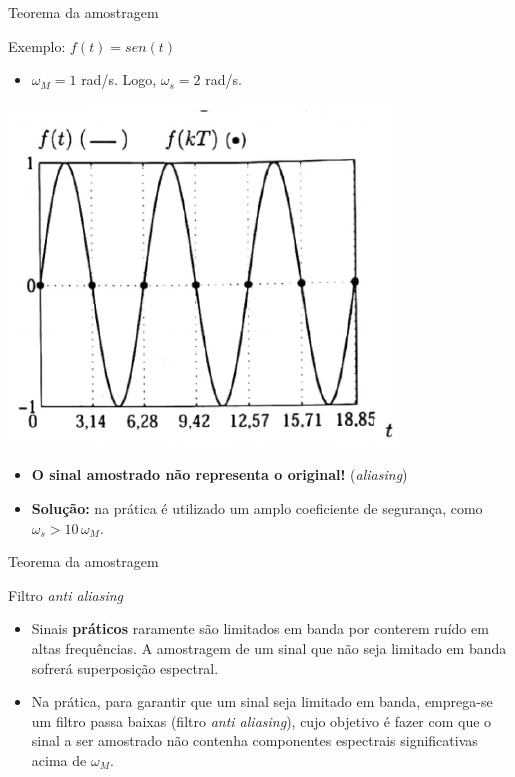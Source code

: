 \begin{frame}{Teorema da amostragem}
\begin{block}{Exemplo: $f(t) = sen(t)$}
\begin{itemize}
    \item $\omega_M = 1$ rad/s. Logo, $\omega_s = 2$ rad/s.
\end{itemize}
\end{block}
\centerline{\includegraphics[width=0.4\linewidth]{Figuras/Ch02/fig12.PNG}}
\begin{block}{}
\begin{itemize}
    \item \textbf{O sinal amostrado não representa o original!} (\textit{aliasing})
    \item \textbf{Solução:} na prática é utilizado um amplo coeficiente de segurança, como $\omega_s > 10 \, \omega_M$.
\end{itemize}
\end{block}
\end{frame}

\begin{frame}{Teorema da amostragem}
\begin{block}{Filtro \textit{anti aliasing}}
\begin{itemize}
    \item Sinais \textbf{práticos} raramente são limitados em banda por conterem ruído em altas frequências. A amostragem de um sinal que não seja  limitado em banda sofrerá superposição espectral. 
    \item Na prática, para garantir que um sinal seja limitado em banda, emprega-se um filtro passa baixas (filtro \textit{anti aliasing}), cujo objetivo é fazer com que o sinal a ser amostrado não contenha componentes espectrais significativas acima de $\omega_M$.
\end{itemize}
\end{block}
\end{frame}

